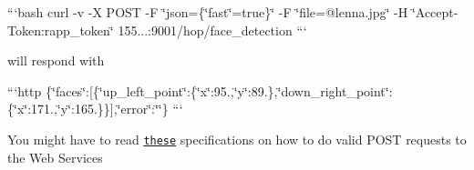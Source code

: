 ```bash curl -\/v -\/\-X P\-O\-S\-T -\/\-F \char`\"{}json=\{\char`\"{}fast\char`\"{}=true\}\char`\"{} -\/\-F \char`\"{}file=@lenna.\-jpg\char`\"{} -\/\-H \char`\"{}\-Accept-\/\-Token\-:rapp\-\_\-token\char`\"{} 155...\-:9001/hop/face\-\_\-detection ```

will respond with

```http \{\char`\"{}faces\char`\"{}\-:\mbox{[}\{\char`\"{}up\-\_\-left\-\_\-point\char`\"{}\-:\{\char`\"{}x\char`\"{}\-:95.,\char`\"{}y\char`\"{}\-:89.\},\char`\"{}down\-\_\-right\-\_\-point\char`\"{}\-:\{\char`\"{}x\char`\"{}\-:171.,\char`\"{}y\char`\"{}\-:165.\}\}\mbox{]},\char`\"{}error\char`\"{}\-:\char`\"{}\char`\"{}\} ```

You might have to read \href{https://github.com/rapp-project/rapp-platform/tree/master/rapp_web_services/services#service-specifications---request-arguments-and-response-objects}{\tt these} specifications on how to do valid P\-O\-S\-T requests to the Web Services 